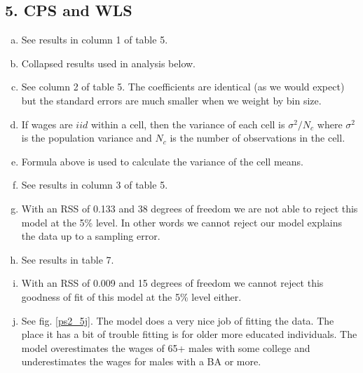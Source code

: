 \documentclass[11pt]{article}
\begin{document}
\newpage
\subsection*{5. CPS and WLS}

\begin{enumerate}[a)]

	\item See results in column 1 of table 5. 
		

	\item Collapsed results used in analysis below.

	\item See column 2 of table 5. The coefficients are identical (as we would expect) but the standard errors are much smaller when we weight by bin size. 

	\item If wages are $iid$ within a cell, then the variance of each cell is $\sigma^2 / N_c$ where $\sigma^2$ is the population variance and $N_c$ is the number of observations in the cell.
 
	\item Formula above is used to calculate the variance of the cell means.

	\item See results in column 3 of table 5. 

	\item With an RSS of 0.133 and 38 degrees of freedom we are not able to reject this model at the 5\% level. In other words we cannot reject our model explains the data up to a sampling error. 

	\item See results in table 7. 
		
	\item With an RSS of 0.009 and 15 degrees of freedom we cannot reject this goodness of fit of this model at the 5\% level either. 
	\item See fig. \ref{ps2_5j}. The model does a very nice job of fitting the data. The place it has a bit of trouble fitting is for older more educated individuals. The model overestimates the wages of 65+ males with some college and underestimates the wages for males with a BA or more. 


\end{enumerate}
\end{document}

